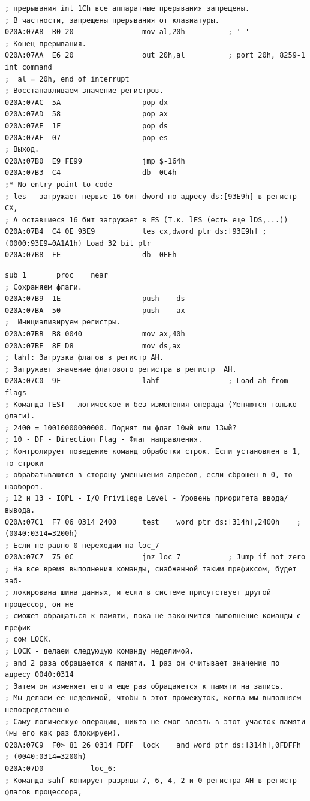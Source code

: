 \begin{lstlisting}[label=some-code,caption=Код прерывания INT 8h]
; прерывания int 1Ch все аппаратные прерывания запрещены.
; В частности, запрещены прерывания от клавиатуры.
020A:07A8  B0 20				mov	al,20h			; ' '
; Конец прерывания.
020A:07AA  E6 20				out	20h,al			; port 20h, 8259-1 int command
;  al = 20h, end of interrupt
; Восстанавливаем значение регистров. 
020A:07AC  5A					pop	dx
020A:07AD  58					pop	ax
020A:07AE  1F					pop	ds
020A:07AF  07					pop	es
; Выход.
020A:07B0  E9 FE99				jmp	$-164h
020A:07B3  C4					db	0C4h
;* No entry point to code
; les - загружает первые 16 бит dword по адресу ds:[93E9h] в регистр CX,
; А оставшиеся 16 бит загружает в ES (Т.к. lES (есть еще lDS,...))
020A:07B4  C4 0E 93E9			les	cx,dword ptr ds:[93E9h]	; (0000:93E9=0A1A1h) Load 32 bit ptr
020A:07B8  FE					db	0FEh
\end{lstlisting}

\begin{lstlisting}[label=some-code,caption=Код подпрограммы sub\_1]
				sub_1		proc	near
; Сохраняем флаги.
020A:07B9  1E					push	ds
020A:07BA  50					push	ax
;  Инициализируем регистры.
020A:07BB  B8 0040				mov	ax,40h
020A:07BE  8E D8				mov	ds,ax
; lahf: Загрузка флагов в регистр АН.
; Загружает значение флагового регистра в регистр  АН. 
020A:07C0  9F					lahf				; Load ah from flags
; Команда TEST - логическое и без изменения операда (Меняются только флаги).
; 2400 = 10010000000000. Поднят ли флаг 10ый или 13ый?
; 10 - DF - Direction Flag - Флаг направления. 
; Контролирует поведение команд обработки строк. Если установлен в 1, то строки 
; обрабатываются в сторону уменьшения адресов, если сброшен в 0, то наоборот.
; 12 и 13 - IOPL - I/O Privilege Level - Уровень приоритета ввода/вывода.
020A:07C1  F7 06 0314 2400		test	word ptr ds:[314h],2400h	; (0040:0314=3200h)
; Если не равно 0 переходим на loc_7
020A:07C7  75 0C				jnz	loc_7			; Jump if not zero
; На все время выполнения команды, снабженной таким префиксом, будет заб-
; локирована шина данных, и если в системе присутствует другой процессор, он не
; сможет обращаться к памяти, пока не закончится выполнение команды с префик-
; сом LOCK.
; LOCK - делаеи следующую команду неделимой.
; and 2 раза обращается к памяти. 1 раз он считывает значение по адресу 0040:0314
; Затем он изменяет его и еще раз обращаяется к памяти на запись.
; Мы делаем ее неделимой, чтобы в этот промежуток, когда мы выполняем непосредственно
; Саму логическую операцию, никто не смог влезть в этот участок памяти (мы его как раз блокируем).
020A:07C9  F0> 81 26 0314 FDFF  lock	and	word ptr ds:[314h],0FDFFh	; (0040:0314=3200h)
020A:07D0			loc_6:
; Команда sahf копирует разряды 7, 6, 4, 2 и 0 регистра АН в регистр флагов процессора, 

\end{lstlisting}
